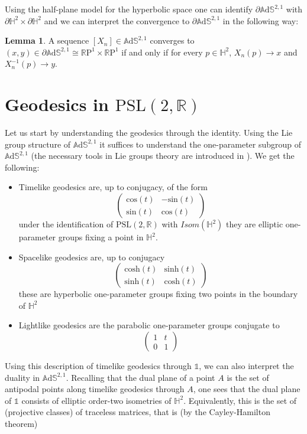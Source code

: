 \documentclass[10pt,a4paper,oneside,reqno]{book}
\def\R{\mathbb{R}}
\def\H{\mathbb{H}}
\def\A{\mathbb{A}\mathrm{d}\mathbb{S}}
\def\1{\mathds{1}}
\def\PSL{\text{PSL}(2,\R)}
\def\T{\R\text{P}^1\times\R\text{P}^1}
\theoremstyle{plain}
\theoremstyle{definition}
\newtheorem{lemma}[theorem]{Lemma} %
\theoremstyle{plain}
\theoremstyle{plain}
\theoremstyle{mystyleNormalFont}
\begin{document}
Using the half-plane model for the hyperbolic space one can identify $\partial \A^{2,1}$ with $\partial \H^2 \times \partial \H^2$ and we can interpret the convergence to $\partial \A^{2,1}$ in the following way:
\begin{lemma}
    A sequence $[X_n] \in \A^{2,1}$ converges to $(x,y) \in \partial \A^{2,1} \cong \T$ if and only if for every $p\in\H^2$, $X_n(p) \to x$ and $X_n^{-1}(p) \to y$.
\end{lemma}

\section{Geodesics in $\PSL$}
Let us start by understanding the geodesics through the identity. Using the Lie group structure of $\A^{2,1}$ it suffices to understand the one-parameter subgroup of $\A^{2,1}$
(the necessary tools in Lie groups theory are introduced in \cite{bonsanteseppi}). We get the following:
\begin{itemize}
    \item Timelike geodesics are, up to conjugacy, of the form
    \[ \begin{pmatrix}
        \text{cos}(t) & -\text{sin}(t) \\
        \text{sin}(t) & \text{cos}(t)
    \end{pmatrix} \]
    under the identification of $\PSL$ with $Isom(\H^2)$ they are elliptic one-parameter groups fixing a point in $\H^2$.
    \item Spacelike geodesics are, up to conjugacy
    \[ \begin{pmatrix}
        \text{cosh}(t) & \text{sinh}(t) \\
        \text{sinh}(t) & \text{cosh}(t)
    \end{pmatrix} \]
    these are hyperbolic one-parameter groups fixing two points in the boundary of $\H^2$
    \item Lightlike geodesics are the parabolic one-parameter groups conjugate to
    \[ \begin{pmatrix}
        1 & t \\
        0 & 1
    \end{pmatrix} \]
\end{itemize}
Using this description of timelike geodesics through $\1$, we can also interpret the duality in $\A^{2,1}$. Recalling that the dual plane of a point $A$ is the set of antipodal points along timelike geodesics through $A$, one sees that the dual plane of $\1$ consists of elliptic order-two isometries of $\H^2$. Equivalently, this is the set of (projective classes) of traceless matrices, that is (by the Cayley-Hamilton theorem)
\end{document}
